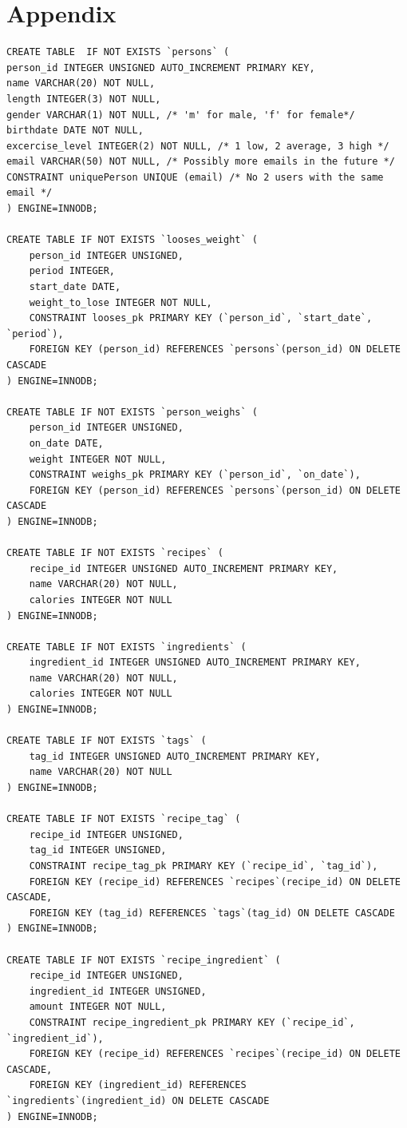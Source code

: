 \section*{Appendix}
\begin{lstlisting}[caption=Script of database]
CREATE TABLE  IF NOT EXISTS `persons` (
person_id INTEGER UNSIGNED AUTO_INCREMENT PRIMARY KEY,
name VARCHAR(20) NOT NULL,
length INTEGER(3) NOT NULL,
gender VARCHAR(1) NOT NULL, /* 'm' for male, 'f' for female*/
birthdate DATE NOT NULL,
excercise_level INTEGER(2) NOT NULL, /* 1 low, 2 average, 3 high */
email VARCHAR(50) NOT NULL, /* Possibly more emails in the future */
CONSTRAINT uniquePerson UNIQUE (email) /* No 2 users with the same email */
) ENGINE=INNODB;

CREATE TABLE IF NOT EXISTS `looses_weight` (
    person_id INTEGER UNSIGNED,
    period INTEGER,
    start_date DATE,
    weight_to_lose INTEGER NOT NULL,
    CONSTRAINT looses_pk PRIMARY KEY (`person_id`, `start_date`, `period`),
    FOREIGN KEY (person_id) REFERENCES `persons`(person_id) ON DELETE CASCADE
) ENGINE=INNODB;

CREATE TABLE IF NOT EXISTS `person_weighs` (
    person_id INTEGER UNSIGNED,
    on_date DATE,
    weight INTEGER NOT NULL,
    CONSTRAINT weighs_pk PRIMARY KEY (`person_id`, `on_date`),
    FOREIGN KEY (person_id) REFERENCES `persons`(person_id) ON DELETE CASCADE
) ENGINE=INNODB;

CREATE TABLE IF NOT EXISTS `recipes` (
    recipe_id INTEGER UNSIGNED AUTO_INCREMENT PRIMARY KEY,
    name VARCHAR(20) NOT NULL,
    calories INTEGER NOT NULL
) ENGINE=INNODB;

CREATE TABLE IF NOT EXISTS `ingredients` (
    ingredient_id INTEGER UNSIGNED AUTO_INCREMENT PRIMARY KEY,
    name VARCHAR(20) NOT NULL,
    calories INTEGER NOT NULL
) ENGINE=INNODB;

CREATE TABLE IF NOT EXISTS `tags` (
    tag_id INTEGER UNSIGNED AUTO_INCREMENT PRIMARY KEY,
    name VARCHAR(20) NOT NULL
) ENGINE=INNODB;

CREATE TABLE IF NOT EXISTS `recipe_tag` (
    recipe_id INTEGER UNSIGNED,
    tag_id INTEGER UNSIGNED,
    CONSTRAINT recipe_tag_pk PRIMARY KEY (`recipe_id`, `tag_id`),
    FOREIGN KEY (recipe_id) REFERENCES `recipes`(recipe_id) ON DELETE CASCADE,
    FOREIGN KEY (tag_id) REFERENCES `tags`(tag_id) ON DELETE CASCADE
) ENGINE=INNODB;

CREATE TABLE IF NOT EXISTS `recipe_ingredient` (
    recipe_id INTEGER UNSIGNED,
    ingredient_id INTEGER UNSIGNED,
    amount INTEGER NOT NULL,
    CONSTRAINT recipe_ingredient_pk PRIMARY KEY (`recipe_id`, `ingredient_id`),
    FOREIGN KEY (recipe_id) REFERENCES `recipes`(recipe_id) ON DELETE CASCADE,
    FOREIGN KEY (ingredient_id) REFERENCES `ingredients`(ingredient_id) ON DELETE CASCADE
) ENGINE=INNODB;


\end{lstlisting}
